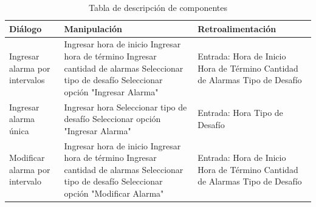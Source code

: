 \begin{table}[H]
    \centering
    \caption{Tabla de descripción de componentes}
    \vspace{5pt}
\begin{tabular}{|p{4cm}|p{5cm}|p{5cm}|}
    \hline
    \textbf{Diálogo} & \textbf{Manipulación} & \textbf{Retroalimentación} \\ \hline
    Ingresar alarma por intervalos &
    Ingresar hora de inicio\newline
    Ingresar hora de término\newline
    Ingresar cantidad de alarmas\newline
    Seleccionar tipo de desafío\newline
    Seleccionar opción "Ingresar Alarma"
    &
    Entrada:\newline
    Hora de Inicio\newline
    Hora de Término\newline
    Cantidad de Alarmas\newline
    Tipo de Desafío\newline
\\ \hline
    Ingresar alarma única &
    Ingresar hora\newline
    Seleccionar tipo de desafío\newline
    Seleccionar opción "Ingresar Alarma"
    &
    Entrada:\newline
    Hora\newline
    Tipo de Desafío\newline
 \\ \hline
    Modificar alarma por intervalo &
    Ingresar hora de inicio\newline
    Ingresar hora de término\newline
    Ingresar cantidad de alarmas\newline
    Seleccionar tipo de desafío\newline
    Seleccionar opción "Modificar Alarma"
    &
    Entrada:\newline
    Hora de Inicio\newline
    Hora de Término\newline
    Cantidad de Alarmas\newline
    Tipo de Desafío\newline
    

\end{tabular}
\end{table}
